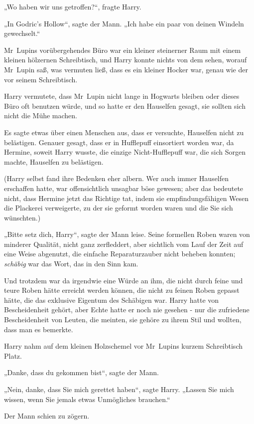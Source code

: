{„Wo haben wir uns getroffen?“, fragte Harry.

„In Godric's Hollow“, sagte der Mann. „Ich habe ein paar von deinen Windeln gewechselt.“

Mr~Lupins vorübergehendes Büro war ein kleiner steinerner Raum mit einem kleinen hölzernen Schreibtisch, und Harry konnte nichts von dem sehen, worauf Mr~Lupin saß, was vermuten ließ, dass es ein kleiner Hocker war, genau wie der vor seinem Schreibtisch.

Harry vermutete, dass Mr~Lupin nicht lange in Hogwarts bleiben oder dieses Büro oft benutzen würde, und so hatte er den Hauselfen gesagt, sie sollten sich nicht die Mühe machen.

Es sagte etwas über einen Menschen aus, dass er versuchte, Hauselfen nicht zu belästigen. Genauer gesagt, dass er in Hufflepuff einsortiert worden war, da Hermine, soweit Harry wusste, die einzige Nicht-Hufflepuff war, die sich Sorgen machte, Hauselfen zu belästigen.

(Harry selbst fand ihre Bedenken eher albern. Wer auch immer Hauselfen erschaffen hatte, war offensichtlich unsagbar böse gewesen; aber das bedeutete nicht, dass Hermine jetzt das Richtige tat, indem sie empfindungsfähigen Wesen die Plackerei verweigerte, zu der sie geformt worden waren und die Sie sich wünschten.)

„Bitte setz dich, Harry“, sagte der Mann leise. Seine formellen Roben waren von minderer Qualität, nicht ganz zerfleddert, aber sichtlich vom Lauf der Zeit auf eine Weise abgenutzt, die einfache Reparaturzauber nicht beheben konnten; \emph{schäbig} war das Wort, das in den Sinn kam.

Und trotzdem war da irgendwie eine Würde an ihm, die nicht durch feine und teure Roben hätte erreicht werden können, die nicht zu feinen Roben gepasst hätte, die das exklusive Eigentum des Schäbigen war. Harry hatte von Bescheidenheit gehört, aber Echte hatte er noch nie gesehen - nur die zufriedene Bescheidenheit von Leuten, die meinten, sie gehöre zu ihrem Stil und wollten, dass man es bemerkte.

Harry nahm auf dem kleinen Holzschemel vor Mr~Lupins kurzem Schreibtisch Platz.

„Danke, dass du gekommen bist“, sagte der Mann.

„Nein, danke, dass Sie mich gerettet haben“, sagte Harry. „Lassen Sie mich wissen, wenn Sie jemals etwas Unmögliches brauchen.“

Der Mann schien zu zögern.

}
